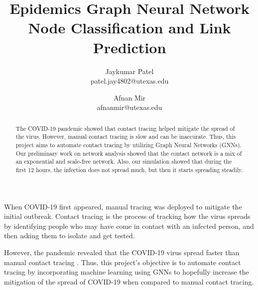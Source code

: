 \documentclass[times, 10pt,twocolumn]{article}
\begin{document}
\title{Epidemics Graph Neural Network Node Classification and Link Prediction}

\author{Jaykumar Patel\\
patel.jay4802@utexas.edu\\
\and
Afnan Mir\\
afnanmir@utexas.edu\\
}

\maketitle
\thispagestyle{empty}

\begin{abstract}
The COVID-19 pandemic showed that contact tracing helped mitigate the spread of the virus. However, manual contact tracing is slow and can be inaccurate. Thus, this project aims to automate contact tracing by utilizing Graph Neural Networks (GNNs). Our preliminary work on network analysis showed that the contact network is a mix of an exponential and scale-free network. Also, our simulation showed that during the first 12 hours, the infection does not spread much, but then it starts spreading steadily. 
\end{abstract}



When COVID-19 first appeared, manual tracing was deployed to mitigate the initial outbreak. Contact tracing is the process of tracking how the virus spreads by identifying people who may have come in contact with an infected person, and then asking them to isolate and get tested.

However, the pandemic revealed that the COVID-19 virus spread faster than manual contact tracing \cite{flaxman2020estimating}. Thus, this project's objective is to automate contact tracing by incorporating machine learning using GNNs to hopefully increase the mitigation of the spread of COVID-19 when compared to manual contact tracing.


\end{document}
